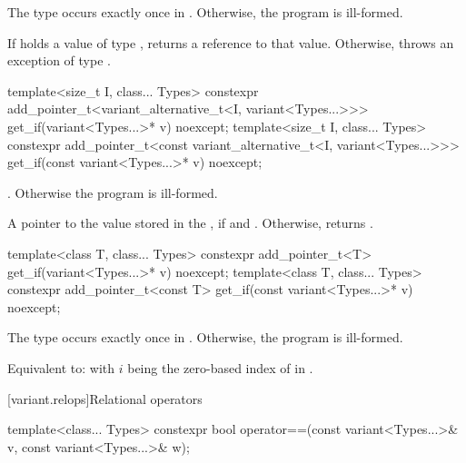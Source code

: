\begin{itemdescr}
\pnum
\requires
The type  occurs exactly once in .
Otherwise, the program is ill-formed.

\pnum
\effects
If  holds a value of type , returns a reference to that value.
Otherwise, throws an exception of type .
\end{itemdescr}

%
%
\begin{itemdecl}
template<size_t I, class... Types>
  constexpr add_pointer_t<variant_alternative_t<I, variant<Types...>>>
    get_if(variant<Types...>* v) noexcept;
template<size_t I, class... Types>
  constexpr add_pointer_t<const variant_alternative_t<I, variant<Types...>>>
    get_if(const variant<Types...>* v) noexcept;
\end{itemdecl}

\begin{itemdescr}
\pnum
\requires
{}.
Otherwise the program is ill-formed.

\pnum
\returns
A pointer to the value stored in the , if 
and . Otherwise, returns .
\end{itemdescr}

%
%
\begin{itemdecl}
template<class T, class... Types>
  constexpr add_pointer_t<T>
    get_if(variant<Types...>* v) noexcept;
template<class T, class... Types>
  constexpr add_pointer_t<const T>
    get_if(const variant<Types...>* v) noexcept;
\end{itemdecl}

\begin{itemdescr}
\pnum
\requires
The type  occurs exactly once in .
Otherwise, the program is ill-formed.

\pnum
\effects
Equivalent to:  with $i$ being the zero-based
index of  in .
\end{itemdescr}

[variant.relops]{Relational operators}

%
\begin{itemdecl}
template<class... Types>
  constexpr bool operator==(const variant<Types...>& v, const variant<Types...>& w);
\end{itemdecl}

